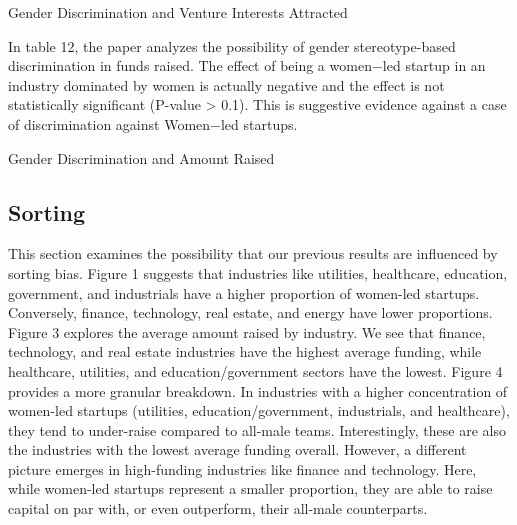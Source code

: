 \begin{table}[H]
 \captionsetup{justification=raggedright,singlelinecheck=false}
    \caption{Gender Discrimination and Venture Interests Attracted}
        
\end{table}


In table 12, the paper analyzes the possibility of gender stereotype-based discrimination in funds raised. The effect of being a women$-$led startup in an industry dominated by women is actually negative and the effect is not statistically significant (P-value > 0.1). This is suggestive evidence against a case of discrimination against Women$-$led startups. 

\begin{table}[H]
 \captionsetup{justification=raggedright,singlelinecheck=false}
    \caption{Gender Discrimination and Amount Raised}
        
\end{table}


\subsection{Sorting}
This section examines the possibility that our previous results are influenced by sorting bias. Figure 1 suggests that industries like utilities, healthcare, education, government, and industrials have a higher proportion of women-led startups. Conversely, finance, technology, real estate, and energy have lower proportions. Figure 3 explores the average amount raised by industry. We see that finance, technology, and real estate industries have the highest average funding, while healthcare, utilities, and education/government sectors have the lowest. Figure 4 provides a more granular breakdown. In industries with a higher concentration of women-led startups (utilities, education/government, industrials, and healthcare), they tend to under-raise compared to all-male teams. Interestingly, these are also the industries with the lowest average funding overall. However, a different picture emerges in high-funding industries like finance and technology. Here, while women-led startups represent a smaller proportion, they are able to raise capital on par with, or even outperform, their all-male counterparts.  




